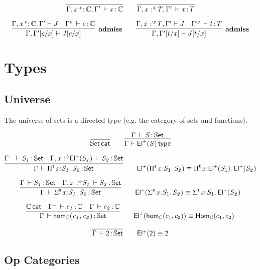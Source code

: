 \documentclass[11pt]{article}
\theoremstyle{plain}
\begin{document}
\[
\infer{\ofdtp{\Gamma,\vtptm{x}{\co}{\C},\Gamma'}{x}{\C}}{}
\qquad
\infer{\oftp{\Gamma,\tptmv{x}{\coc}{T},\Gamma'}{x}{T}}{}
\]


\[
\infer[\textbf{admiss}]
      {\Gamma,\subst{\Gamma'}{c}{x} \vdash \subst{J}{c}{x}}
      {\Gamma,\vtptm{x}{v}{\C},\Gamma' \vdash {J} &
        \oftp{\Gamma^v}{c}{\C}}
\qquad
\infer[\textbf{admiss}]
      {\Gamma,\subst{\Gamma'}{t}{x} \vdash \subst{J}{t}{x}}
      {\Gamma,\tptmv{x}{w}{T},\Gamma' \vdash {J} &
        \oftp{\Gamma^w}{t}{T}}
\]

\section{Types}

\subsection{Universe}

The universe of sets is a directed type (e.g. the category of sets and
functions).

\[
\infer{\wfdtp{\types}}{}
\qquad
\infer{\wftp{\Gamma}{\Elp{S}}}
      {\oftp{\Gamma}{S}{\types}}
\]

\[
\infer{\oftp{\Gamma}{\piset{x}{S_1}{S_2}}{\types}}
      {\oftp{\Gamma^\con}{S_1}{\types} &
        \oftp{\Gamma, \tptmv {x}{\conc}{\Elp{S_1}}}{S_2}{\types}}
\qquad
\Elp{\piset{x}{S_1}{S_2}} \deq \pitp{x}{\Elp{S_1}}{\Elp{S_2}}
\]

\[
\infer{\oftp{\Gamma}{\sigmaset{x}{S_1}{S_2}}{\types}}
      {\oftp{\Gamma}{S_1}{\types} &
        \oftp{\Gamma, \tptmv {x}{\coc}{S_1}}{S_2}{\types}}
\qquad
\Elp{\sigmaset{x}{S_1}{S_2}} \deq \sigmatp{x}{S_1}{\Elp{S_2}}
\]

\[
\infer{\oftp{\Gamma}{\homset{\C}{c_1}{c_2}}{\types}}
      {\wfdtp{\C} &
        \oftp{\Gamma^\con}{c_1}{\C} &
        \oftp{\Gamma}{c_2}{\C}}
\qquad
\Elp{\homset{\C}{c_1}{c_2}} \deq \homtp{\C}{c_1}{c_2}
\]

\[
\infer{\oftp{\Gamma}{\bool}{\types}}
      {}
\qquad
\Elp{\bool} \deq \bool
\]




\subsection{Op Categories}
\end{document}
